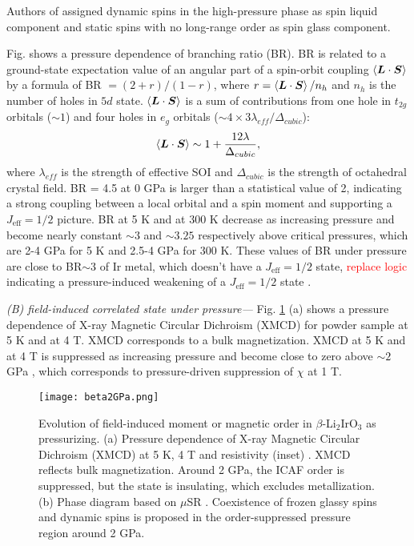 Authors of \cite{Majumder2018} assigned dynamic spins in the high-pressure phase as spin liquid component and static spins with no long-range order as spin glass component.

Fig. shows a pressure dependence of branching ratio (BR).
BR is related to a ground-state expectation value of an angular part of a spin-orbit coupling $\braket{\bm{L}\cdot\bm{S}}$ by a formula of BR $= (2 + r)/(1 - r)$, where $r = \braket{\bm{L}\cdot\bm{S}}/n_h$ and $n_h$ is the number of holes in $5d$ state.
$\braket{\bm{L}\cdot\bm{S}}$ is a sum of contributions from one hole in $t_{2g}$ orbitals ($\sim 1$) and four holes in $e_g$ orbitals ($\sim 4\times3\lambda_{eff}/\Delta_{cubic}$):
\begin{equation}
  \braket{\bm{L}\cdot\bm{S}} \sim 1 + \frac{12\lambda}{\Delta_{cubic}},
\end{equation}
where $\lambda_{eff}$ is the strength of effective SOI and $\Delta_{cubic}$ is the strength of octahedral crystal field.
BR = 4.5 at 0 GPa is larger than a statistical value of 2, indicating a strong coupling between a local orbital and a spin
moment and supporting a $J_\mathrm{eff} = 1/2$ picture.
BR at 5 K and at 300 K decrease as increasing pressure and become nearly constant $\sim 3$ and $\sim 3.25$ respectively above critical pressures, which are 2-4 GPa for 5 K and 2.5-4 GPa for 300 K.
These values of BR under pressure are close to BR$\sim 3$ of Ir metal, which doesn't have a $J_\mathrm{eff} = 1/2$ state,
\textcolor{red}{replace logic} indicating a pressure-induced weakening of a $J_\mathrm{eff} = 1/2$ state \cite{}.

\vspace{3mm}
\noindent\textit{(B) field-induced correlated state under pressure---}
Fig. \ref{beta2GPa} (a) shows a pressure dependence of X-ray Magnetic Circular Dichroism (XMCD) for powder sample at 5 K and at 4 T.
XMCD corresponds to a bulk magnetization.
XMCD at 5 K and at 4 T is suppressed as increasing pressure and become close to zero above $\sim 2$ GPa , which corresponds to pressure-driven suppression of $\chi$ at 1 T.

\begin{figure}
  \centering
  \texttt{[image: beta2GPa.png]}
  \caption{Evolution of field-induced moment or magnetic order in $\beta$-Li$_2$IrO$_3$ as pressurizing.
  (a) Pressure dependence of X-ray Magnetic Circular Dichroism (XMCD) at 5 K, 4 T and resistivity (inset) \cite{takayama2015hyperhoneycomb}.
  XMCD reflects bulk magnetization.
  Around 2 GPa, the ICAF order is suppressed, but the state is insulating, which excludes metallization.
  (b) Phase diagram based on $\mu$SR \cite{Majumder2018}.
  Coexistence of frozen glassy spins and dynamic spins is proposed in the order-suppressed pressure region around 2 GPa.}
  \label{beta2GPa}
\end{figure}

